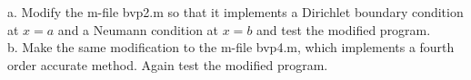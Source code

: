 a. Modify the m-file bvp2.m so that it implements a Dirichlet boundary condition at $x=a$ and a
Neumann condition at $x=b$ and test the modified program.\\
b. Make the same modification to the m-file bvp4.m, which implements a fourth order accurate method.
Again test the modified program.\\


\newpage

\newpage
